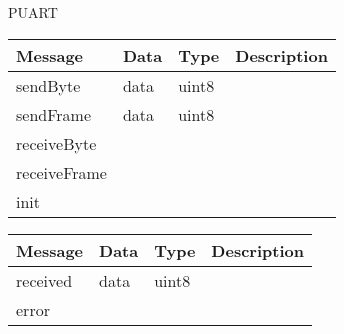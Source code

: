  {PUART}

\begin{tabular}[ht]{|l|l|l|p{8cm}|}
\hline
Message & Data & Type & Description\\
\hline
sendByte &  data  &  uint8  & \\
\hline
sendFrame &  data  &  uint8  & \\
\hline
receiveByte &  &  & \\
\hline
receiveFrame &  &  & \\
\hline
init &  &  & \\
\hline
\end{tabular}
\begin{tabular}[ht]{|l|l|l|p{8cm}|}
\hline
Message & Data & Type & Description\\
\hline
received &  data  &  uint8  & \\
\hline
error &  &  & \\
\hline
\end{tabular}

